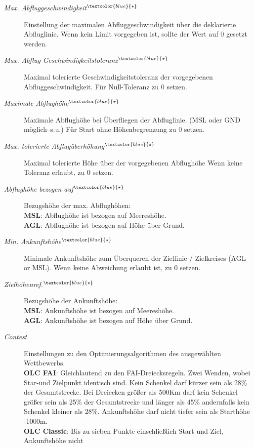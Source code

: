 \begin{description}
\item[\textit{Max. Abfluggeschwindigkeit$^{\textcolor{blue}{\star}}$}] Einstellung der maximalen Abfluggeschwindigkeit über die deklarierte Abfluglinie.
   Wenn kein Limit vorgegeben ist, sollte der Wert auf $0$ gesetzt werden.
\item[\textit{Max. Abflug-Geschwindigkeitstoleranz$^{\textcolor{blue}{\star}}$}] Maximal tolerierte Geschwindigkeitstoleranz der vorgegebenen Abfluggeschwindigkeit.
   Für Null-Toleranz zu $0$ setzen.
\item[\textit{Maximale Abflughöhe$^{\textcolor{blue}{\star}}$}]  Maximale Abflughöhe bei Überfliegen der Abfluglinie.
   (MSL oder GND möglich--s.u.) Für Start ohne Höhenbegrenzung zu $0$ setzen.
\item[\textit{Max. tolerierte Abflugüberhöhung$^{\textcolor{blue}{\star}}$}]  Maximal tolerierte Höhe über der vorgegebenen Abflughöhe
   Wenn keine Toleranz erlaubt, zu $0$ setzen.
\item[\textit{Abflughöhe bezogen auf$^{\textcolor{blue}{\star}}$}]  Bezugshöhe der max. Abflughöhen:\\
    {\bf MSL}: Abflughöhe ist bezogen auf Meereshöhe.\\
    {\bf AGL}: Abflughöhe ist bezogen auf Höhe über Grund.
\item[\textit{Min. Ankunftshöhe$^{\textcolor{blue}{\star}}$}]  Minimale Ankunftshöhe zum Überqueren der Ziellinie / Zielkreises
    (AGL or MSL). Wenn keine Abweichung erlaubt ist, zu $0$ setzen.
\item[\textit{Zielhöhenref.$^{\textcolor{blue}{\star}}$}] Bezugshöhe der Ankunftshöhe:\\
    {\bf MSL}: Ankunftshöhe ist bezogen auf Meereshöhe.\\
    {\bf AGL}: Ankunftshöhe ist bezogen auf Höhe über Grund.
\item[\textit{Contest}]  Einstellungen zu den Optimierungsalgorithmen des ausgewählten Wettbewerbs. \\
   {\bf OLC FAI}: Gleichlautend zu den FAI-Dreiecksregeln. Zwei Wenden, wobei Star-und Zielpunkt identisch sind.
   Kein Schenkel darf kürzer sein als 28\% der Gesamtstrecke. Bei Dreiecken größer als 500Km
   darf kein Schenkel größer sein als 25\% der Gesamtstrecke und länger als 45\% andernfalls kein
   Schenkel kleiner als 28\%. Ankunftshöhe darf nicht  tiefer sein als Starthöhe -1000m.\\
   {\bf OLC Classic}: Bis zu sieben Punkte einschließlich Start und Ziel, Ankunftshöhe nicht

\end{description}
